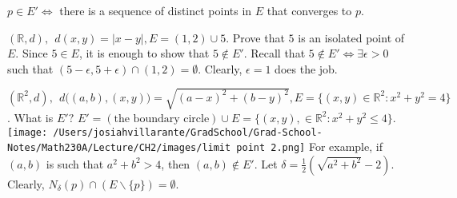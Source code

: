 \begin{remark}
    $p \in E' \iff$ there is a sequence of distinct points in $E$ that converges to $p$.
\end{remark}

\begin{example}
    $(\mathbb{R}, d), ~~d(x,y) = |x-y|, E=(1,2) \cup {5}$. Prove that $5$ is an isolated point of $E$.
    Since $5 \in E$, it is enough to show that $5 \not \in E'$. Recall that $5\not \in E' \iff \exists \epsilon > 0$ such that $(5 - \epsilon, 5 + \epsilon) \cap (1,2) = \emptyset$. Clearly, $\epsilon = 1$ does the job.
\end{example}

\begin{example}
    $(\mathbb{R}^2, d), ~~d\big((a,b),(x,y)\big) = \sqrt{(a-x)^2 + (b-y)^2}, E = \{(x,y) \in \mathbb{R}^2 : x^2 + y^2 = 4\}$. What is $E'?$
    $E' = (\text{the boundary circle})\cup E = \{(x,y), \in \mathbb{R}^2 : x^2 + y^2 \leq 4\}$.
    \texttt{[image: /Users/josiahvillarante/GradSchool/Grad-School-Notes/Math230A/Lecture/CH2/images/limit point 2.png]}
    For example, if $(a,b)$ is such that $a^2 + b^2 > 4$, then $(a,b) \not \in E'$. Let $\delta = \frac{1}{2}(\sqrt{a^2 + b^2} - 2)$. Clearly, $N_\delta (p) \cap (E \backslash \{p\}) = \emptyset$.
\end{example}
